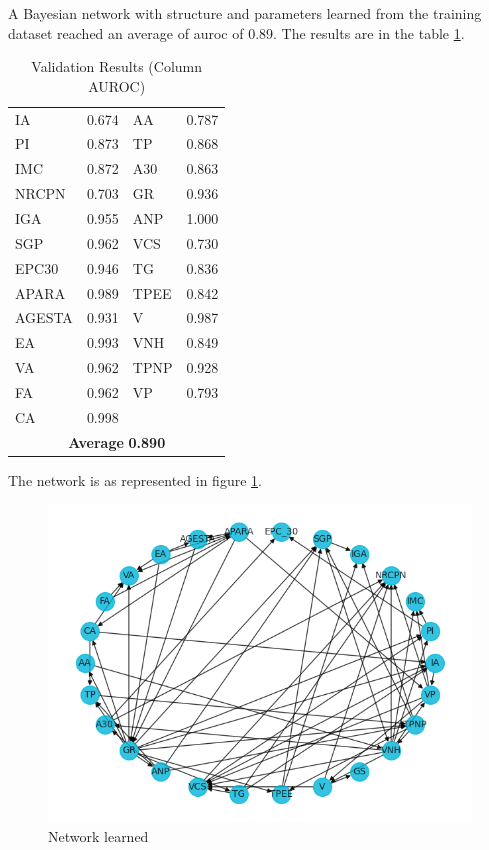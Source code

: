 A Bayesian network with structure and parameters learned from the training dataset reached an average of \ac{auroc} of 0.89. The results are in the table \ref{tab:result_auc}.

\begin{table}[htbp] 
 \caption{Validation Results (Column AUROC)} 
 \label{tab:result_auc} 

\renewcommand{\arraystretch}{1.2}
\setlength{\tabcolsep}{18pt}

\begin{tabularx}{\textwidth} { X X X X  }
\hline
IA & 0.674 & AA & 0.787 \\
PI & 0.873 & TP & 0.868 \\
IMC & 0.872 & A30 & 0.863 \\
NRCPN & 0.703 & GR & 0.936 \\
IGA & 0.955 & ANP & 1.000 \\
SGP & 0.962 & VCS & 0.730 \\
EPC30 & 0.946 & TG & 0.836 \\
APARA & 0.989 & TPEE & 0.842 \\
AGESTA & 0.931 & V & 0.987 \\
EA & 0.993 & VNH & 0.849 \\
VA & 0.962 & TPNP & 0.928 \\
FA & 0.962 & VP & 0.793 \\
CA & 0.998 &  \\
\hline
 \multicolumn{4}{c}{\textbf{Average}  \textbf{0.890}} \\

\hline
\end{tabularx}
\end{table}


The network is as represented in figure \ref{fig:network}.
\begin{figure}[htbp]
\centering
\caption{Network learned}\label{fig:network} 
\includegraphics[scale=0.68]{figures/network.png}
\end{figure}


